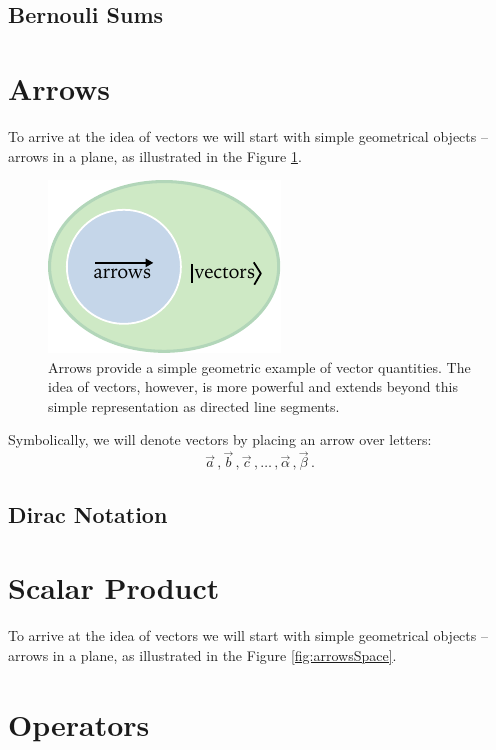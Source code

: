 \subsection{Bernouli Sums}

\section{Arrows}

To arrive at the idea of vectors we will start with simple geometrical
objects -- arrows in a plane, as illustrated in the Figure \ref{fig:arrowsAndVectors}.

\begin{figure}[htbp]
  \centering
  \includegraphics[scale=1.0]{arrowsAndVectors}
  \caption{Arrows provide a simple geometric example of vector quantities. The idea of vectors, however, is more powerful and extends beyond this simple representation as directed line segments.}
  \label{fig:arrowsAndVectors}
\end{figure}

Symbolically, we will denote vectors by placing an arrow over letters:
\[
\vec{a}\,,\vec{b}\,,\vec{c}\,,\ldots\,,\vec{\alpha}\,,\vec{\beta}\,.
\]

\subsection{Dirac Notation}

\section{Scalar Product}

To arrive at the idea of vectors we will start with simple geometrical
objects -- arrows in a plane, as illustrated in the Figure \ref{fig:arrowsSpace}.


\section{Operators}\label{sec:operators}

